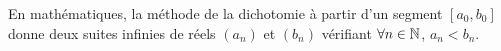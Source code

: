 En mathématiques, la méthode de la dichotomie à partir d'un segment $[a_0,b_0]$ donne deux suites infinies de réels $(a_n)$ et $(b_n)$ vérifiant $\forall n \in \mathbb{N}$, $a_n<b_n$.


